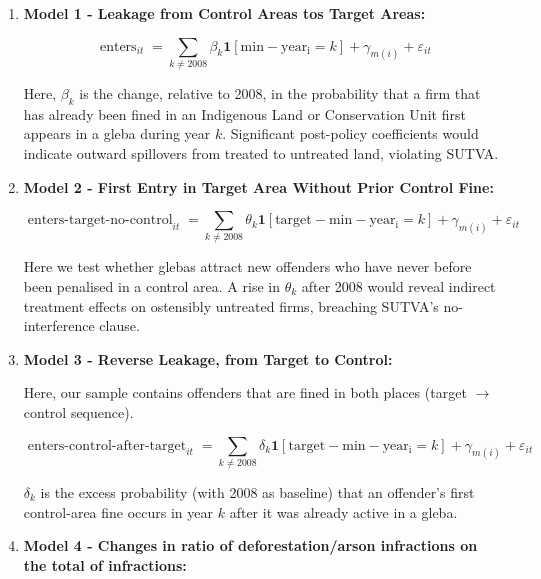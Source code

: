 \documentclass[12pt]{article}
\begin{document}
\begin{enumerate}
    \item \textbf{Model 1 - Leakage from Control Areas tos Target Areas:}

    \begin{equation}
        \operatorname{enters}_{it} = \sum_{k \neq 2008} \beta_k \mathbf{1}\left[\operatorname{min-year_i}=k\right] + \gamma_{m(i)} + \varepsilon_{it}
    \end{equation}

    Here, \(\beta_k\) is the change, relative to 2008, in the probability that a firm that has already been fined in an Indigenous Land or Conservation Unit first appears in a gleba during year \(k\). Significant post-policy coefficients would indicate outward spillovers from treated to untreated land, violating SUTVA.
    
    \item \textbf{Model 2 - First Entry in Target Area Without Prior Control Fine:}
    
    \begin{equation}
        \operatorname{enters-target-no-control}_{it} = \sum_{k \neq 2008} \theta_k \mathbf{1}\left[\operatorname{target-min-year_i}=k\right] + \gamma_{m(i)} + \varepsilon_{it}
    \end{equation}
    
    Here we test whether glebas attract new offenders who have never before been penalised in a control area. A rise in \(\theta_k\) after 2008 would reveal indirect treatment effects on ostensibly untreated firms, breaching SUTVA’s no-interference clause.

    \item \textbf{Model 3 - Reverse Leakage, from Target to Control:}

    Here, our sample contains offenders that are fined in both places (target \(\to\) control sequence).
    
    \begin{equation}
        \operatorname{enters-control-after-target}_{it} = \sum_{k \neq 2008} \delta_k \mathbf{1}\left[\operatorname{target-min-year_i}=k\right] + \gamma_{m(i)} + \varepsilon_{it}
    \end{equation}

  \(\delta_k\) is the excess probability (with 2008 as baseline) that an offender's first control-area fine occurs in year \(k\) after it was already active in a gleba.
    
    \item \textbf{Model 4 - Changes in ratio of deforestation/arson infractions on the total of infractions:}


\end{enumerate}
\end{document}
